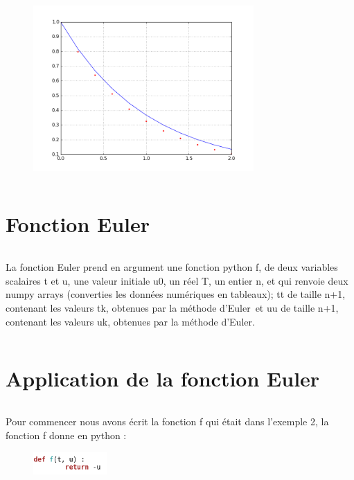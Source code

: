 \documentclass{article}
\begin{document}
\begin{figure}
        \centering
        \includegraphics[width=0.75\textwidth]{graph2.png}
       
\end{figure}

$$ $$
$$ $$
$$ $$
$$ $$
$$ $$
$$ $$
$$ $$
$$ $$
$$ $$
$$ $$
$$ $$

\section{Fonction Euler}
$$ $$

La fonction Euler prend en argument une fonction python f, de deux variables scalaires t et u, une valeur initiale u0, un réel T, un entier n, et qui renvoie deux numpy arrays (converties les données numériques en tableaux); tt de taille n+1, contenant les valeurs tk, obtenues par la méthode d'Euler et uu de taille n+1, contenant les valeurs uk, obtenues par la méthode d'Euler.

$$ $$
$$ $$

\section{Application de la fonction Euler}
$$ $$

Pour commencer nous avons écrit la fonction f qui était dans l'exemple 2, la fonction f donne en python :
\newline
\newline
\begin{figure}
        \centering
        \includegraphics[width=0.25\textwidth]{f.png}
\end{figure}
\end{document}
